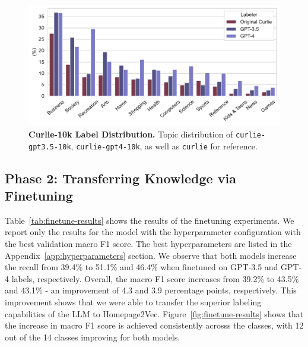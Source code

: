 \begin{figure}[!ht]
    \centering
    \includegraphics[width=.8\columnwidth]{figures/curlie-10k-dist.pdf}
    \caption{\textbf{Curlie-10k Label Distribution.} Topic distribution of \texttt{curlie-gpt3.5-10k}, \texttt{curlie-gpt4-10k}, as well as \texttt{curlie} for reference.}
    \label{fig:curlie-10k-dist}
\end{figure}

\subsection*{Phase 2: Transferring Knowledge via Finetuning}



Table~\ref{tab:finetune-results} shows the results of the finetuning experiments. We report only the results for the model with the hyperparameter configuration with the best validation macro F1 score. The best hyperparameters are listed in the Appendix~\ref{app:hyperparameters} section. We observe that both models increase the recall from 39.4\% to 51.1\% and 46.4\% when finetuned on GPT-3.5 and GPT-4 labels, respectively. Overall, the macro F1 score increases from 39.2\% to 43.5\% and 43.1\% - an improvement of 4.3 and 3.9 percentage points, respectively.
This improvement shows that we were able to transfer the superior labeling capabilities of the LLM to Homepage2Vec. Figure~\ref{fig:finetune-results} shows that the increase in macro F1 score is achieved consistently acrosss the classes, with 12 out of the 14 classes improving for both models.




